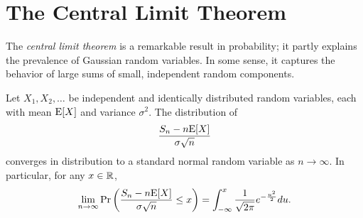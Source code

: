 \section{The Central Limit Theorem}

The \emph{central limit theorem} is a remarkable result in probability; it partly explains the prevalence of Gaussian random variables.
In some sense, it captures the behavior of large sums of small, independent random components.

\begin{theorem} 
Let $X_1, X_2, \ldots$ be independent and identically distributed random variables, each with mean $\mathrm{E} [X]$ and variance $\sigma^2$.
The distribution of
\begin{equation*}
\frac{ S_n - n \mathrm{E} [X] }{ \sigma \sqrt{n} }
\end{equation*}
converges in distribution to a standard normal random variable as $n \rightarrow \infty$.
In particular, for any $x \in \mathbb{R}$,
\begin{equation*}
\lim_{n \rightarrow \infty}
\Pr \left( \frac{ S_n - n \mathrm{E} [X] }{ \sigma \sqrt{n} } \leq x \right)
= \int_{- \infty}^x \frac{1}{\sqrt{2 \pi}} e^{- \frac{u^2}{2}} du .
\end{equation*}
\end{theorem}

